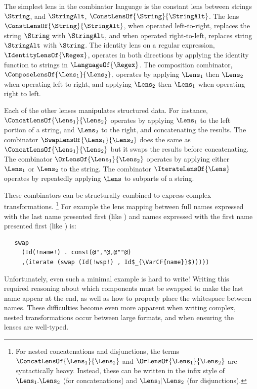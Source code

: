 \documentclass[sigplan,acmsmall]{acmart}
\begin{document}
The simplest lens in the combinator language is the constant lens between
strings $\String$, and $\StringAlt$, $\ConstLensOf{\String}{\StringAlt}$.
The lens $\ConstLensOf{\String}{\StringAlt}$, when operated left-to-right,
replaces the string $\String$ with $\StringAlt$, and when operated
right-to-left, replaces string $\StringAlt$ with $\String$.  The identity lens
on a regular expression, $\IdentityLensOf{\Regex}$, operates in both
directions by applying the
identity function to strings in $\LanguageOf{\Regex}$.  The composition
combinator, 
$\ComposeLensOf{\Lens_1}{\Lens_2}$, operates by applying $\Lens_1$ then $\Lens_2$
when operating left to right, and applying $\Lens_2$ then $\Lens_1$ when
operating right to left.

Each of the other lenses manipulates structured data.  For instance,
$\ConcatLensOf{\Lens_1}{\Lens_2}$ operates by applying $\Lens_1$ to the left
portion of a string, and $\Lens_2$ to the right, and concatenating the results.
The combinator
$\SwapLensOf{\Lens_1}{\Lens_2}$ does the same as $\ConcatLensOf{\Lens_1}{\Lens_2}$
but it swaps the results before concatenating.
The combinator $\OrLensOf{\Lens_1}{\Lens_2}$ operates by applying either $\Lens_1$ or $\Lens_2$
to the string.  The combinator $\IterateLensOf{\Lens}$ operates by repeatedly
applying $\Lens$ to subparts of a string.

These combinators can be structurally combined to express complex
transformations.
\footnote{For nested concatenations and disjunctions, the terms
  $\ConcatLensOf{\Lens_1}{\Lens_2}$ and $\OrLensOf{\Lens_1}{\Lens_2}$ are
  syntactically heavy.  Instead, these can be written in the infix style
  of $\Lens_1 . \Lens_2$ (for concatenations) and $\Lens_1 | \Lens_2$ (for disjunctions).}
For example the lens mapping between full names expressed with the last name
presented first (like ) and names expressed with
the first name presented first (like )
is:
%
\begin{lstlisting}
   swap
     (Id(!name!) . const(@","@,@""@)
     ,(iterate (swap (Id(!wsp!) , Id$_{\VarCF{name}}$)))))
\end{lstlisting}
%
Unfortunately, even such a minimal example is hard to write!  Writing this
required reasoning 
about which components must be swapped to make the last name appear at the end, as
well as how to properly place the whitespace between names.  These difficulties
become even more apparent when writing complex, nested transformations occur
between large formats, and when ensuring the lenses are well-typed.
\end{document}
